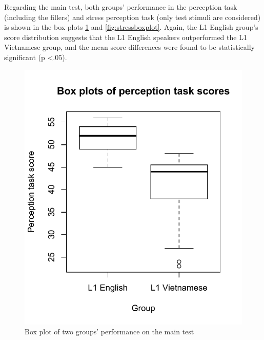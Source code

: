 \documentclass[a4paper]{article}
\begin{document}


Regarding the main test, both groups' performance in the perception task (including the fillers) and stress perception task (only test stimuli are considered) is shown in the box plots \ref{fig:perceptionboxplot} and \ref{fig:stressboxplot}. Again, the L1 English group's score distribution suggests that the L1 English speakers outperformed the L1 Vietnamese group, and the mean score differences were found to be statistically significant (p \textless .05).

\begin{figure}[H]
\begin{center}  
\includegraphics[scale=0.7]{perceptionboxplot.pdf} 
\caption{Box plot of two groups' performance on the main test}
\label{fig:perceptionboxplot}
\end{center}   
\end{figure}


\end{document}
